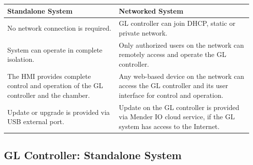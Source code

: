 \documentclass[11pt,twoside]{book}
\begin{document}
{{{{{{{{{\begin{longtable}[]{@{}ll@{}}
\toprule
\begin{minipage}[b]{0.48\columnwidth}\raggedright
Standalone System\strut
\end{minipage} & \begin{minipage}[b]{0.46\columnwidth}\raggedright
Networked System\strut
\end{minipage}\tabularnewline
\midrule
\endhead
\begin{minipage}[t]{0.48\columnwidth}\raggedright
No network connection is required.\strut
\end{minipage} & \begin{minipage}[t]{0.46\columnwidth}\raggedright
GL controller can join DHCP, static or private network.\strut
\end{minipage}\tabularnewline
\begin{minipage}[t]{0.48\columnwidth}\raggedright
System can operate in complete isolation.\strut
\end{minipage} & \begin{minipage}[t]{0.46\columnwidth}\raggedright
Only authorized users on the network can remotely access and operate the
GL controller.\strut
\end{minipage}\tabularnewline
\begin{minipage}[t]{0.48\columnwidth}\raggedright
The HMI provides complete control and operation of the GL controller and
the chamber.\strut
\end{minipage} & \begin{minipage}[t]{0.46\columnwidth}\raggedright
Any web-based device on the network can access the GL controller and its
user interface for control and operation.\strut
\end{minipage}\tabularnewline
\begin{minipage}[t]{0.48\columnwidth}\raggedright
Update or upgrade is provided via USB external port.\strut
\end{minipage} & \begin{minipage}[t]{0.46\columnwidth}\raggedright
Update on the GL controller is provided via Mender IO cloud service, if
the GL system has access to the Internet.\strut
\end{minipage}\tabularnewline
\bottomrule
\end{longtable}

\hypertarget{gl-controller-standalone-system}{%
\subsection{GL Controller: Standalone
System}

}}}}}}}}}}
\end{document}
